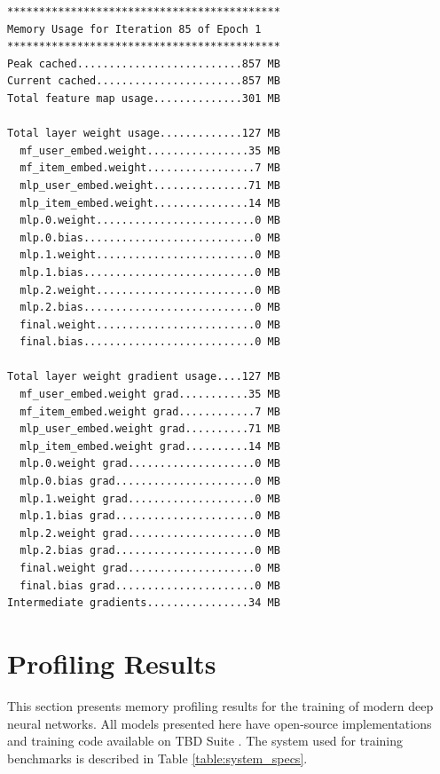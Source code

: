 \documentclass[12pt,letterpaper]{article}
\begin{document}
\begin{verbatim}
*******************************************
Memory Usage for Iteration 85 of Epoch 1
*******************************************
Peak cached..........................857 MB
Current cached.......................857 MB
Total feature map usage..............301 MB

Total layer weight usage.............127 MB
  mf_user_embed.weight................35 MB
  mf_item_embed.weight.................7 MB
  mlp_user_embed.weight...............71 MB
  mlp_item_embed.weight...............14 MB
  mlp.0.weight.........................0 MB
  mlp.0.bias...........................0 MB
  mlp.1.weight.........................0 MB
  mlp.1.bias...........................0 MB
  mlp.2.weight.........................0 MB
  mlp.2.bias...........................0 MB
  final.weight.........................0 MB
  final.bias...........................0 MB

Total layer weight gradient usage....127 MB
  mf_user_embed.weight grad...........35 MB
  mf_item_embed.weight grad............7 MB
  mlp_user_embed.weight grad..........71 MB
  mlp_item_embed.weight grad..........14 MB
  mlp.0.weight grad....................0 MB
  mlp.0.bias grad......................0 MB
  mlp.1.weight grad....................0 MB
  mlp.1.bias grad......................0 MB
  mlp.2.weight grad....................0 MB
  mlp.2.bias grad......................0 MB
  final.weight grad....................0 MB
  final.bias grad......................0 MB
Intermediate gradients................34 MB
\end{verbatim}
\newpage
%
%
\section{Profiling Results}
\label{profiling_results}
This section presents memory profiling results for the training of modern deep neural networks. All models presented here have open-source implementations and training code available on TBD Suite \cite{tbd_suite}. The system used for training benchmarks is described in Table \ref{table:system_specs}.

\begin{table}[H]
\centering
{}
\caption{Specification of system used for profiling}
\label{table:system_specs}
\end{table}
\end{document}

